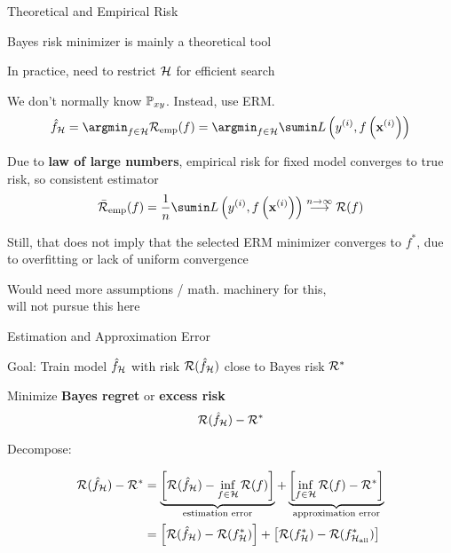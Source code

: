 \documentclass[11pt,compress,t,notes=noshow, xcolor=table]{beamer}
\begin{document}
\begin{framei}[sep=M]{Theoretical and Empirical Risk}  
 
\item Bayes risk minimizer is mainly a theoretical tool
\item In practice, need to restrict $\mathcal{H}$ for efficient search %
\item We don't normally know $\mathbb{P}_{xy}$. Instead, use ERM. 
$$
{\hat f}_{\Hspace} = \argmin_{f \in \Hspace} \riskef = \argmin_{f \in \Hspace} \sumin \Lxyi
$$
\item Due to \textbf{law of large numbers}, empirical risk for fixed model converges to true risk, so consistent estimator
$$
\riskeb(f) = \frac{1}{n} \sumin \Lxyi \overset{n \to \infty}{\longrightarrow} \riskf 
$$
\item Still, that does not imply that the selected ERM minimizer converges to $f^{\ast}$, due to overfitting or lack of uniform convergence 
\item Would need more assumptions / math. machinery for this, \\
will not pursue this here 

\end{framei}



\begin{framei}[sep=L]{Estimation and Approximation Error} 

    \item Goal: Train model $\hat f_{\mathcal{H}}$ with risk $\mathcal{R}(\hat f_{\mathcal{H}})$ close to Bayes risk $\mathcal{R}^\ast$ \\
    \item Minimize \textbf{Bayes regret} or \textbf{excess risk}
$$
	\mathcal{R}(\hat f_{\mathcal{H}}) - \mathcal{R}^\ast
$$ 

\item Decompose: 

\begin{align*}
	\mathcal{R}(\hat f_{\mathcal{H}}) - \mathcal{R}^\ast &= \underbrace{\left[\mathcal{R}(\hat f_{\mathcal{H}}) - \inf_{f \in \mathcal{H}} \mathcal{R}(f)\right]}_{\text{estimation error}} + \underbrace{\left[\inf_{f \in \mathcal{H}} \mathcal{R}(f) - \mathcal{R}^\ast\right]}_{\text{approximation error}} \\
    &= \left[\mathcal{R}(\hat{f}_{\mathcal{H}}) - \mathcal{R}(f^{\ast}_{\mathcal{H}})\right] + \left[\mathcal{R}(f^{\ast}_{\mathcal{H}}) - \mathcal{R}(f^{\ast}_{\mathcal{H}_{\text{all}}}) \right] 
\end{align*}

\end{framei}
\end{document}
